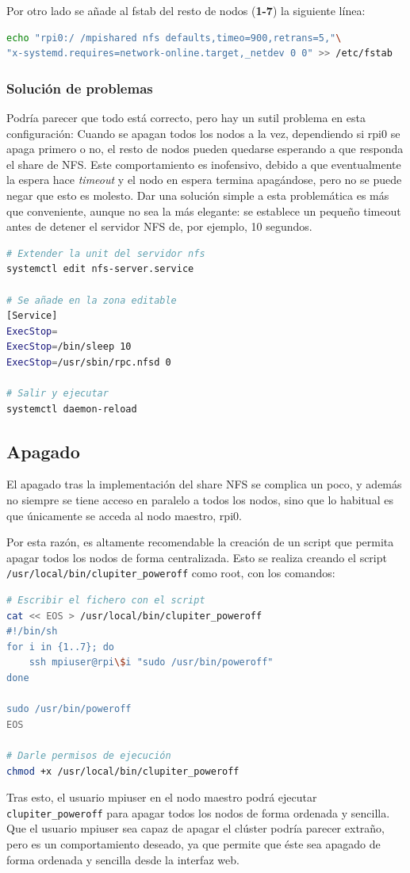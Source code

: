 Por otro lado se añade al fstab del resto de nodos (\textbf{1-7}) la siguiente línea:
\begin{lstlisting}[language=bash]
echo "rpi0:/ /mpishared nfs defaults,timeo=900,retrans=5,"\
"x-systemd.requires=network-online.target,_netdev 0 0" >> /etc/fstab
\end{lstlisting}

\subsubsection{Solución de problemas}
Podría parecer que todo está correcto, pero hay un sutil problema en esta configuración: Cuando se apagan todos los nodos a la vez, dependiendo si rpi0 se apaga primero o no, el resto de nodos pueden quedarse esperando a que responda el share de NFS. Este comportamiento es inofensivo, debido a que eventualmente la espera hace \textit{timeout} y el nodo en espera termina apagándose, pero no se puede negar que esto es molesto. Dar una solución simple a esta problemática es más que conveniente, aunque no sea la más elegante: se establece un pequeño timeout antes de detener el servidor NFS de, por ejemplo, 10 segundos.

\begin{lstlisting}[language=bash]
# Extender la unit del servidor nfs
systemctl edit nfs-server.service

# Se añade en la zona editable
[Service]
ExecStop=
ExecStop=/bin/sleep 10
ExecStop=/usr/sbin/rpc.nfsd 0

# Salir y ejecutar
systemctl daemon-reload
\end{lstlisting}

\subsection{Apagado}
\label{ssec:apagado_impl}
El apagado tras la implementación del share NFS se complica un poco, y además no siempre se tiene acceso en paralelo a todos los nodos, sino que lo habitual es que únicamente se acceda al nodo maestro, rpi0.

Por esta razón, es altamente recomendable la creación de un script que permita apagar todos los nodos de forma centralizada. Esto se realiza creando el script \texttt{/usr/local/bin/clupiter\_poweroff} como root, con los comandos:

\begin{lstlisting}[language=bash]
# Escribir el fichero con el script
cat << EOS > /usr/local/bin/clupiter_poweroff
#!/bin/sh
for i in {1..7}; do
    ssh mpiuser@rpi\$i "sudo /usr/bin/poweroff"
done

sudo /usr/bin/poweroff
EOS

# Darle permisos de ejecución
chmod +x /usr/local/bin/clupiter_poweroff
\end{lstlisting}

Tras esto, el usuario mpiuser en el nodo maestro podrá ejecutar \texttt{clupiter\_poweroff} para apagar todos los nodos de forma ordenada y sencilla. Que el usuario mpiuser sea capaz de apagar el clúster podría parecer extraño, pero es un comportamiento deseado, ya que permite que éste sea apagado de forma ordenada y sencilla desde la interfaz web.